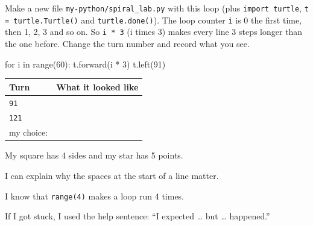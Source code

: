 \begin{creative}
Make a new file \texttt{my-python/spiral\_lab.py} with this loop (plus \texttt{import turtle}, \texttt{t = turtle.Turtle()} and \texttt{turtle.done()}). The loop counter \texttt{i} is 0 the first time, then 1, 2, 3 and so on. So \texttt{i * 3} (i times 3) makes every line 3 steps longer than the one before. Change the turn number and record what you see.
\begin{pycode}
for i in range(60):
    t.forward(i * 3)
    t.left(91)
\end{pycode}
\begin{center}
\renewcommand{\arraystretch}{1.6}
\begin{tabular}{@{}p{2.5cm}p{10cm}@{}}
\toprule
Turn & What it looked like\\
\midrule
\texttt{91} & \\ \midrule
\texttt{121} & \\ \midrule
my choice: & \\
\bottomrule
\end{tabular}
\end{center}
\end{creative}

\begin{selfcheck}
  \item My square has 4 sides and my star has 5 points.
  \item I can explain why the spaces at the start of a line matter.
  \item I know that \texttt{range(4)} makes a loop run 4 times.
  \item If I got stuck, I used the help sentence: \enquote{I expected \ldots{} but \ldots{} happened.}
\end{selfcheck}
